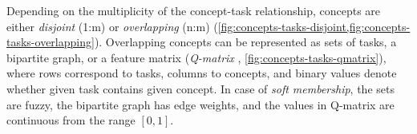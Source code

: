 
Depending on the multiplicity of the concept-task relationship,
concepts are either \emph{disjoint} (1:m) or \emph{overlapping} (n:m)
(\cref{fig:concepts-tasks-disjoint,fig:concepts-tasks-overlapping}).
Overlapping concepts can be represented as sets of tasks, a bipartite graph,
or a feature matrix
(\emph{Q-matrix} \cite{qmatrix}, \cref{fig:concepts-tasks-qmatrix}),
where rows correspond to tasks, columns to concepts,
and binary values denote whether given task contains given concept. %
In case of \emph{soft membership}, the sets are fuzzy, the bipartite graph has
edge weights, and the values in Q-matrix are continuous from the range $[0, 1]$.

